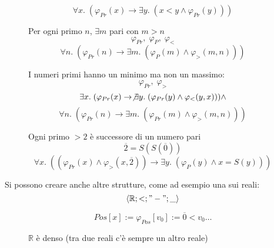 \documentclass{article}
\theoremstyle{break}
\theoremstyle{break}
\theoremstyle{break}
\theoremstyle{break}
\begin{document}
\begin{figure}[H]
  \begin{example}
    \[
      \forall x.\; (\varphi _{Pr}(x) \to \exists y.\; (x < y \wedge \varphi _{Pr}(y)))
    \] 
  \end{example}
\end{figure}

\begin{figure}[H]
  \begin{example}
    Per ogni primo \( n \), \( \exists m \) pari con \( m > n \) 
    \[
      \varphi_{Pr},\; \varphi_{P},\; \varphi_{<}
    \] 
    \[
      \forall n.\; (\varphi_{Pr}(n) \to \exists m.\; (\varphi_{P}(m) \wedge \varphi_{>}(m,n) ))
    \] 
  \end{example}
\end{figure}

\begin{figure}[H]
  \begin{example}
    I numeri primi hanno un minimo ma non un massimo:
    \[
      \varphi_{Pr},\; \varphi_{>}
    \] 
    \[
      \exists x.\; (\varphi_{Pr}(x) \to \not\exists y.\; (\varphi_{Pr}(y) \wedge \varphi_{<}(y,x))) \wedge 
    \] 
    \[
    \forall n.\; (\varphi_{Pr}(n) \to \exists m.\; (\varphi_{Pr}(m) \wedge \varphi_{>}(m,n) ))
    \] 
  \end{example}
\end{figure}

\begin{figure}[H]
  \begin{example}
    Ogni primo \( >2 \) è successore di un numero pari
    \[
      \overline{2} = S(S(\overline{0}))
    \] 
    \[
      \forall x.\; ((\varphi _{Pr}(x) \wedge \varphi_{>}(x, \overline{2})) \to \exists y.\; (\varphi_{P}(y) \wedge x = S(y)))
    \] 
  \end{example}
\end{figure}

Si possono creare anche altre strutture, come ad esempio una sui reali:
\[
\left< \mathbb{R}; <; "-"; \_ \right>
\] 

\begin{figure}[H]
  \begin{exercise}[A casa]
    \[
      Pos[x] := \varphi_{Pos}[v_0] := \overline{0} < v_0 \ldots
    \] 
  \end{exercise}
\end{figure}

\begin{figure}[H]
  \begin{exercise}[A casa]
    \( \mathbb{R} \) è denso (tra due reali c'è sempre un altro reale)
  \end{exercise}
\end{figure}
    
\end{document}
